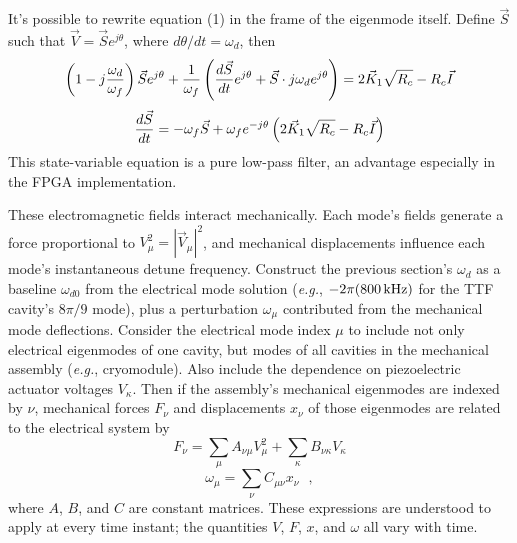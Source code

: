 It's possible to rewrite equation (1) in the frame of the eigenmode itself.
Define $\vec S$ such that $\vec V = \vec S e^{j\theta}$,
where $d\theta/dt = \omega_d$, then
$$\left(1-j{\omega_d\over \omega_f}\right)\vec S e^{j\theta} +
 {1\over\omega_f}\left({d\vec S\over dt}e^{j\theta} +
  \vec S \cdot j\omega_d e^{j\theta}\right) =
 2\vec K_1\sqrt{R_c} - R_c\vec I $$
$${d\vec S\over dt} = -\omega_f\vec S  + \omega_f e^{-j\theta}\left(
 2\vec K_1\sqrt{R_c} - R_c\vec I \right)$$
This state-variable equation is a pure low-pass filter, an advantage especially
in the FPGA implementation.

These electromagnetic fields interact mechanically.
Each mode's fields generate a force proportional to $V_\mu^2 = |\vec V_\mu|^2$,
and mechanical displacements influence each mode's instantaneous
detune frequency.  Construct the previous section's $\omega_d$ as
a baseline $\omega_{d0}$ from the electrical mode solution
({\it e.g.}, $-2\pi (800\thinspace {\rm kHz})$ for the TTF cavity's
$8\pi/9$ mode), plus a perturbation
$\omega_{\mu}$ contributed from the mechanical mode deflections.
Consider the electrical mode index $\mu$ to include
not only electrical eigenmodes of one cavity, but modes of all cavities in the
mechanical assembly ({\it e.g.}, cryomodule).
Also include the dependence on piezoelectric actuator voltages $V_\kappa$.
Then if the assembly's mechanical eigenmodes are indexed by $\nu$,
mechanical forces $F_\nu$ and displacements $x_\nu$ of those eigenmodes
are related to the electrical system by
$$F_\nu = \sum_\mu A_{\nu\mu} V_\mu^2 + \sum_\kappa B_{\nu\kappa}V_\kappa$$
$$\omega_\mu = \sum_\nu C_{\mu\nu} x_\nu~~~,$$
where $A$, $B$, and $C$ are constant matrices.
These expressions are understood to apply at every time instant;
the quantities $V$, $F$, $x$, and $\omega$ all vary with time.

